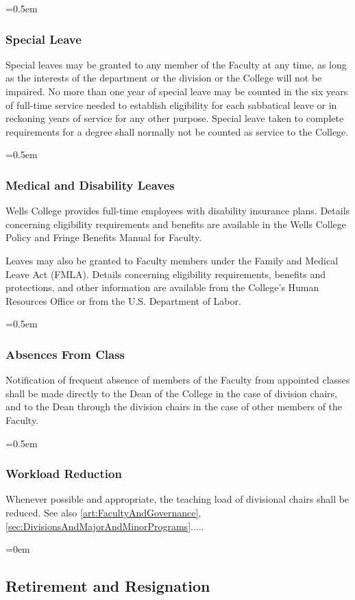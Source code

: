 \documentclass{manual}
\let\oldsubsection\subsection
\renewcommand\subsection{\leftskip=0em\oldsubsection}
\let\oldsubsubsection\subsubsection
\renewcommand\subsubsection{\leftskip=0.5em\oldsubsubsection}
\begin{document}
\subsubsection{Special Leave}\label{sec:FacultyCommittees.B}
Special leaves may be granted to any member of the Faculty at any time, as long as the interests of the department or the division or the College will not be impaired. No more than one year of special leave may be counted in the six years of full-time service needed to establish eligibility for each sabbatical leave or in reckoning years of service for any other purpose. Special leave taken to complete requirements for a degree shall normally not be counted as service to the College.

\subsubsection{Medical and Disability Leaves}
Wells College provides full-time employees with disability insurance plans. Details concerning eligibility requirements and benefits are available in the Wells College Policy and Fringe Benefits Manual for Faculty.

Leaves may also be granted to Faculty members under the Family and Medical Leave Act (FMLA). Details concerning eligibility requirements, benefits and protections, and other information are available from the College's Human Resources Office or from the U.S. Department of Labor.


\subsubsection{Absences From Class}
Notification of frequent absence of members of the Faculty from appointed classes shall be made directly to the Dean of the College in the case of division chairs, and to the Dean through the division chairs in the case of other members of the Faculty.

\subsubsection{Workload Reduction} \label{sub:WorkloadReduction}
Whenever possible and appropriate, the teaching load of divisional chairs shall be reduced. See also \cref{art:FacultyAndGovernance}, \cref{sec:DivisionsAndMajorAndMinorPrograms}.....

\subsection{Retirement and Resignation}
\end{document}
